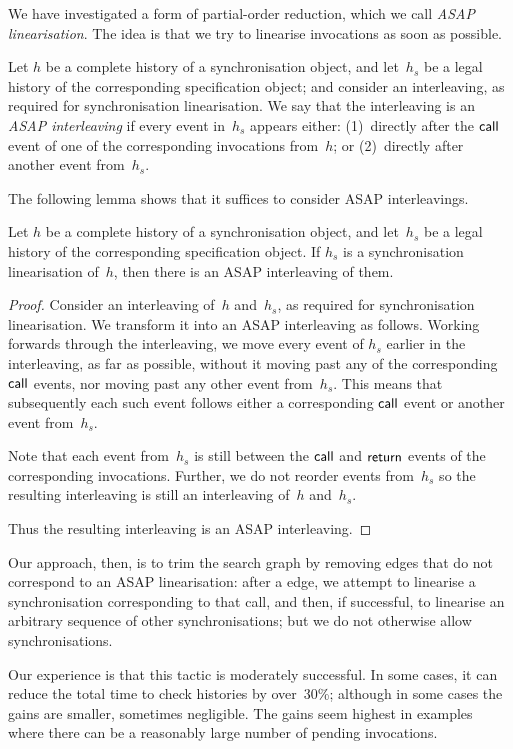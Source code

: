 We have investigated a form of partial-order reduction, which we call
\emph{ASAP linearisation}.  The idea is that we try to linearise invocations
as soon as possible.
%
\begin{definition}
Let $h$ be a complete history of a synchronisation object, and let~$h_s$ be a
legal history of the corresponding specification object; and consider an
interleaving, as required for synchronisation linearisation.  We say that the
interleaving is an \emph{ASAP interleaving} if every event in~$h_s$ appears
either: (1)~directly after the $\mathsf{call}$ event of one of the corresponding
invocations from~$h$; or (2)~directly after another event from~$h_s$.
\end{definition}
%
The following lemma shows that it suffices to consider ASAP interleavings.
%
\begin{lemma}
Let $h$ be a complete history of a synchronisation object, and let~$h_s$ be a
legal history of the corresponding specification object.  If $h_s$ is a
synchronisation linearisation of~$h$, then there is an ASAP interleaving of
them.
\end{lemma}
%
\begin{proof}
Consider an interleaving of~$h$ and~$h_s$, as required for synchronisation
linearisation.  We transform it into an ASAP interleaving as follows.  Working
forwards through the interleaving, we move every event of $h_s$ earlier in the
interleaving, as far as possible, without it moving past any of the corresponding
$\mathsf{call}$ events, nor moving past any other event from~$h_s$.  This means that
subsequently each such event follows either a corresponding $\mathsf{call}$ event or
another event from~$h_s$.

Note that each event from~$h_s$ is still between the $\mathsf{call}$ and $\mathsf{return}$
events of the corresponding invocations.  Further, we do not reorder events
from~$h_s$ so the resulting interleaving is still an interleaving of~$h$
and~$h_s$.

Thus the resulting interleaving is an ASAP interleaving.
\end{proof}
%
Our approach, then, is to trim the search graph by removing
 edges that do not correspond to an ASAP
linearisation: after a  edge, we attempt to linearise a
synchronisation corresponding to that call, and then, if successful, to
linearise an arbitrary sequence of other synchronisations; but we do not
otherwise allow synchronisations.

Our experience is that this tactic is moderately successful.  In some cases,
it can reduce the total time to check histories by over~30\%;
although in some cases the gains are smaller, sometimes negligible.  The gains
seem highest in examples where there can be a reasonably large number of
pending invocations.
 
